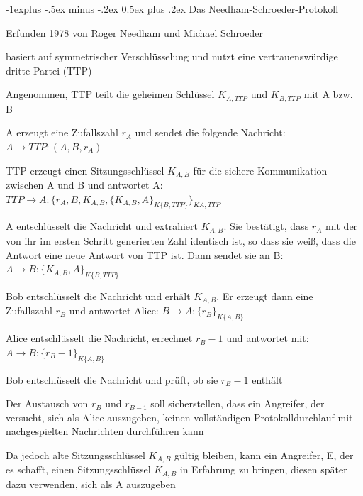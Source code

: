 \documentclass[a4paper]{article}
\makeatletter
\renewcommand{\subsection}{\@startsection{subsection}{2}{0mm}%
 {-1explus -.5ex minus -.2ex}%
 {0.5ex plus .2ex}%
 {\normalfont\normalsize\bfseries}}
\makeatother
\begin{document}
\begin{multicols}{3}
      \subsection{Das Needham-Schroeder-Protokoll}
      \begin{itemize*}
            \item Erfunden 1978 von Roger Needham und Michael Schroeder
            \item basiert auf symmetrischer Verschlüsselung und nutzt eine vertrauenswürdige dritte Partei (TTP)
            \item Angenommen, TTP teilt die geheimen Schlüssel $K_{A,TTP}$ und $K_{B,TTP}$ mit A bzw. B
            \begin{itemize*}
                  \item A erzeugt eine Zufallszahl $r_A$ und sendet die folgende Nachricht: $A\rightarrow TTP: (A, B, r_A)$
                  \item TTP erzeugt einen Sitzungsschlüssel $K_{A,B}$ für die sichere Kommunikation zwischen A und B und antwortet A:  $TTP\rightarrow A:\{r_A, B, K_{A,B}, \{K_{A,B}, A\}_{{K}\{B,TTP\}}\}_{{K}{A,TTP}}$
                  \item A entschlüsselt die Nachricht und extrahiert $K_{A,B}$. Sie bestätigt, dass $r_A$ mit der von ihr im ersten Schritt generierten Zahl identisch ist, so dass sie weiß, dass die Antwort eine neue Antwort von TTP ist. Dann sendet sie an B: $A\rightarrow B:\{K_{A,B}, A\}_{{K}\{B,TTP\}}$
                  \item Bob entschlüsselt die Nachricht und erhält $K_{A,B}$. Er erzeugt dann eine Zufallszahl $r_B$ und antwortet Alice:  $B\rightarrow A:\{r_B\}_{{K}\{A,B\}}$
                  \item Alice entschlüsselt die Nachricht, errechnet $r_{B}-1$ und antwortet mit: $A\rightarrow B:\{r_B-1\}_{{K}\{A,B\}}$
                  \item Bob entschlüsselt die Nachricht und prüft, ob sie $r_B-1$ enthält
            \end{itemize*}
            \item Der Austausch von $r_B$ und $r_{B-1}$ soll sicherstellen, dass ein Angreifer, der versucht, sich als Alice auszugeben, keinen vollständigen Protokolldurchlauf mit nachgespielten Nachrichten durchführen kann
            \item Da jedoch alte Sitzungsschlüssel $K_{A,B}$ gültig bleiben, kann ein Angreifer, E, der es schafft, einen Sitzungsschlüssel $K_{A,B}$ in Erfahrung zu bringen, diesen später dazu verwenden, sich als A auszugeben

\end{itemize*}
\end{multicols}
\end{document}
